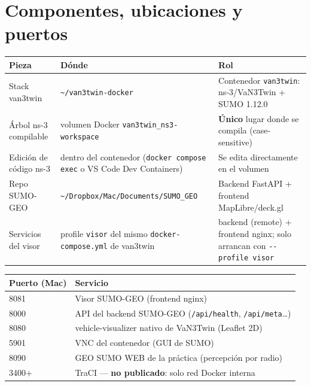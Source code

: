 \documentclass[11pt,a4paper]{article}
\begin{document}
\section{Componentes, ubicaciones y puertos}

\begin{center}
\small
\begin{tabular}{@{}p{}p{}p{}@{}}
\toprule
\textbf{Pieza} & \textbf{Dónde} & \textbf{Rol} \\
\midrule
Stack van3twin & \texttt{\textasciitilde/van3twin-docker} & Contenedor \texttt{van3twin}: ns-3/VaN3Twin + SUMO 1.12.0 \\
Árbol ns-3 compilable & volumen Docker \texttt{van3twin\_ns3-workspace} & \textbf{Único} lugar donde se compila (case-sensitive) \\
Edición de código ns-3 & dentro del contenedor (\texttt{docker compose exec} o VS Code Dev Containers) & Se edita directamente en el volumen \\
Repo SUMO-GEO & \texttt{\textasciitilde/Dropbox/Mac/Documents/SUMO\_GEO} & Backend FastAPI + frontend MapLibre/deck.gl \\
Servicios del visor & profile \texttt{visor} del mismo \texttt{docker-compose.yml} de van3twin & backend (remote) + frontend nginx; solo arrancan con \texttt{-{}-profile visor} \\
\bottomrule
\end{tabular}
\end{center}

\begin{center}
\small
\begin{tabular}{@{}ll@{}}
\toprule
\textbf{Puerto (Mac)} & \textbf{Servicio} \\
\midrule
8081 & Visor SUMO-GEO (frontend nginx) \\
8000 & API del backend SUMO-GEO (\texttt{/api/health}, \texttt{/api/meta}\ldots) \\
8080 & vehicle-visualizer nativo de VaN3Twin (Leaflet 2D) \\
5901 & VNC del contenedor (GUI de SUMO) \\
8090 & GEO SUMO WEB de la práctica (percepción por radio) \\
3400+ & TraCI --- \textbf{no publicado}: solo red Docker interna \\
\bottomrule
\end{tabular}
\end{center}
\end{document}
